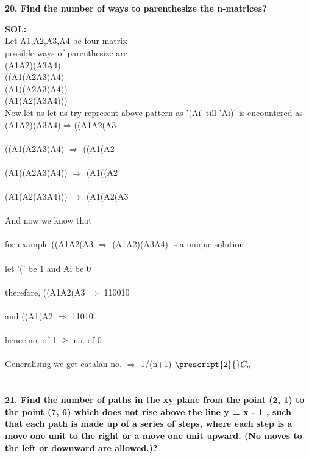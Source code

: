 \documentclass[8pt,a4paper]{article}
\newcommand\Mycomb[2][n]{\prescript{#1\mkern-0.5mu}{}C_{#2}}
\begin{document}
\section{}

\textbf{20. Find the number of ways to parenthesize the n-matrices?}

\textbf{SOL:}\\Let A1,A2,A3,A4 be four matrix\\
possible ways of parenthesize are \\
(A1A2)(A3A4)\\((A1(A2A3)A4)\\(A1((A2A3)A4))\\(A1(A2(A3A4)))\\
Now,let us let us try represent above pattern as '(Ai' till  'Ai)' is encountered as\\
(A1A2)(A3A4)$\Rightarrow$((A1A2(A3\\
\\ ((A1(A2A3)A4) $\Rightarrow$ ((A1(A2 \\
\\ (A1((A2A3)A4)) $\Rightarrow$ (A1((A2\\
\\ (A1(A2(A3A4))) $\Rightarrow$ (A1(A2(A3\\
\\And now we know that \\
\\for example ((A1A2(A3 $\Rightarrow$ (A1A2)(A3A4) is a unique solution \\
\\let '(' be 1 and Ai be 0\\
\\therefore, ((A1A2(A3 $\Rightarrow$ 110010\\
\\and ((A1(A2 $\Rightarrow$ 11010\\
\\hence,no. of 1 $\geq$ no. of 0\\
\\Generalising we get catalan no.  $\Rightarrow$ 1/(n+1) $\Mycomb[2]{n}$\\


\section{}

\textbf{21. Find the number of paths in the xy plane from the point (2, 1) to the point (7, 6) which
does not rise above the line y = x - 1 , such that each path is made up of a series of
steps, where each step is a move one unit to the right or a move one unit upward. (No
moves to the left or downward are allowed.)?}
\end{document}
